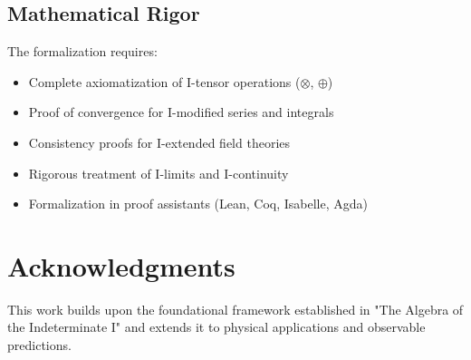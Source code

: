 \documentclass[12pt,a4paper]{article}
\theoremstyle{definition}
\theoremstyle{remark}
\begin{document}
\subsection{Mathematical Rigor}

The formalization requires:

\begin{itemize}
    \item Complete axiomatization of I-tensor operations ($\otimes$, $\oplus$)
    \item Proof of convergence for I-modified series and integrals
    \item Consistency proofs for I-extended field theories
    \item Rigorous treatment of I-limits and I-continuity
    \item Formalization in proof assistants (Lean, Coq, Isabelle, Agda)
\end{itemize}

\section*{Acknowledgments}

This work builds upon the foundational framework established in "The Algebra of the Indeterminate I" and extends it to physical applications and observable predictions.
\end{document}
